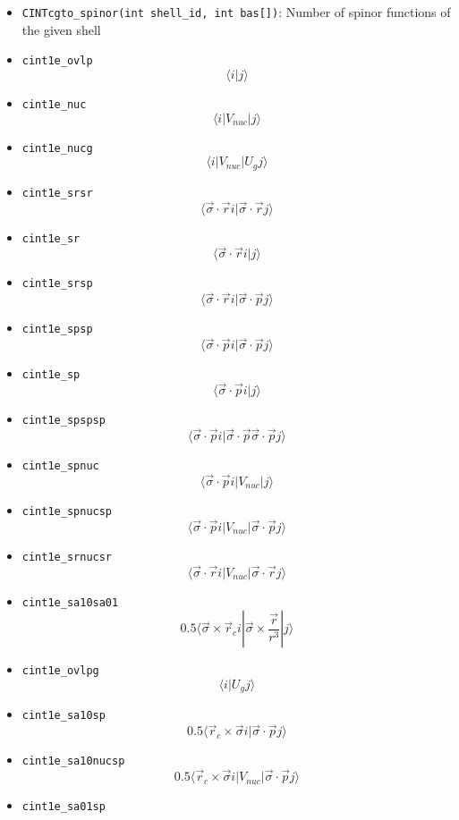 \documentclass[]{article}
\begin{document}
\begin{itemize}
  \begin{itemize}
  \itemsep1pt\parskip0pt
  \item
    \texttt{CINTcgto\_spinor(int shell\_id, int bas{[}{]})}: Number of
    spinor functions of the given shell
  \item
    \texttt{cint1e\_ovlp} \[\langle  i| j\rangle \]
  \item
    \texttt{cint1e\_nuc} \[\langle  i| V_{nuc} |j\rangle \]
  \item
    \texttt{cint1e\_nucg} \[\langle  i| V_{nuc} | U_gj\rangle \]
  \item
    \texttt{cint1e\_srsr}
    \[\langle \vec{\sigma}\cdot\vec{r} i| \vec{\sigma}\cdot\vec{r}j\rangle \]
  \item
    \texttt{cint1e\_sr} \[\langle \vec{\sigma}\cdot\vec{r} i|j\rangle \]
  \item
    \texttt{cint1e\_srsp}
    \[\langle \vec{\sigma}\cdot\vec{r} i| \vec{\sigma}\cdot\vec{p}j\rangle \]
  \item
    \texttt{cint1e\_spsp}
    \[\langle \vec{\sigma}\cdot\vec{p} i| \vec{\sigma}\cdot\vec{p}j\rangle \]
  \item
    \texttt{cint1e\_sp} \[\langle \vec{\sigma}\cdot\vec{p} i|j\rangle \]
  \item
    \texttt{cint1e\_spspsp}
    \[\langle \vec{\sigma}\cdot\vec{p} i| \vec{\sigma}\cdot\vec{p} \vec{\sigma}\cdot\vec{p}j\rangle \]
  \item
    \texttt{cint1e\_spnuc}
    \[\langle \vec{\sigma}\cdot\vec{p} i| V_{nuc} |j\rangle \]
  \item
    \texttt{cint1e\_spnucsp}
    \[\langle \vec{\sigma}\cdot\vec{p} i| V_{nuc} | \vec{\sigma}\cdot\vec{p}j\rangle \]
  \item
    \texttt{cint1e\_srnucsr}
    \[\langle \vec{\sigma}\cdot\vec{r} i| V_{nuc} | \vec{\sigma}\cdot\vec{r}j\rangle \]
  \item
    \texttt{cint1e\_sa10sa01}
    \[0.5\langle\vec{\sigma} \times \vec{r}_c i|\vec{\sigma} \times \frac{\vec{r}}{r^3} |j\rangle \]
  \item
    \texttt{cint1e\_ovlpg} \[\langle i|U_g j\rangle \]
  \item
    \texttt{cint1e\_sa10sp}
    \[0.5\langle\vec{r}_c \times\vec{\sigma} i| \vec{\sigma}\cdot\vec{p}j\rangle \]
  \item
    \texttt{cint1e\_sa10nucsp}
    \[0.5\langle\vec{r}_c \times\vec{\sigma} i| V_{nuc} | \vec{\sigma}\cdot\vec{p}j\rangle \]
  \item
    \texttt{cint1e\_sa01sp}

\end{itemize}
\end{itemize}
\end{document}
